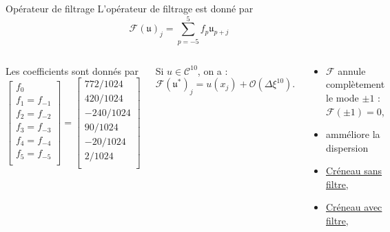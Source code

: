 \documentclass[11pt]{beamer}
\def\gsum{\displaystyle\sum\limits}
\begin{document}
\begin{frame}{Opérateur de filtrage}
L'opérateur de filtrage est donné par
$$
\mathcal{F} (\mathfrak{u})_j = \gsum_{p=-5}^5 f_p \mathfrak{u}_{p+j} 
$$
\begin{columns}
Les coefficients sont donnés par
$$
\begin{bmatrix}
f_0\\
f_1 = f_{-1}\\
f_2 = f_{-2}\\
f_3 = f_{-3}\\
f_4 = f_{-4}\\
f_5 = f_{-5}\\
\end{bmatrix} =
\begin{bmatrix}
772/1024\\
420/1024\\
-240/1024\\
90/1024\\
-20/1024\\
2/1024\\
\end{bmatrix}
$$
\begin{block}{}
Si $u \in \mathcal{C}^{10}$, on a :
$$
\mathcal{F}(\mathfrak{u}^*)_j = u(x_j) + \mathcal{O} \left( \Delta \xi^{10} \right).
$$
\end{block}
\begin{block}{}
\begin{itemize}
\item $\mathcal{F}$ annule complètement le mode $\pm1$ : $\mathcal{F}(\pm1)=0$,
\item amméliore la dispersion
\item \href{run:./simus/creneau_cfl1.avi}{Créneau sans filtre},
\item \href{run:./simus/creneau_ftr10_cfl1.avi}{Créneau avec filtre},
\end{itemize}
\end{block}
\end{columns}
\end{frame}
\end{document}
